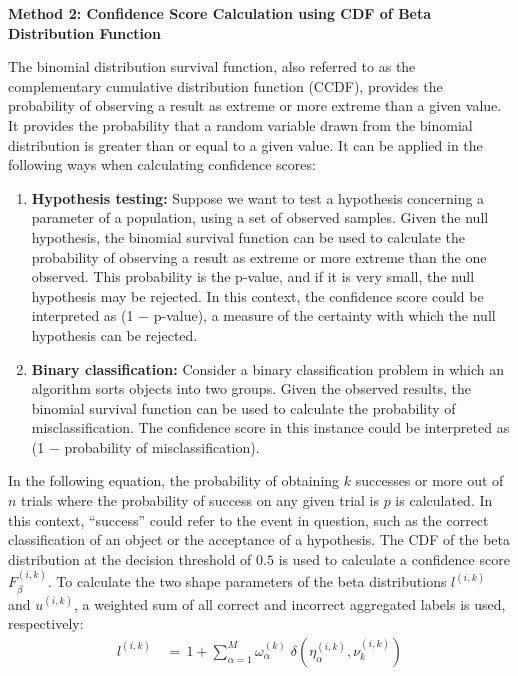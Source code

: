 \documentclass[default]{bst/sn-jnl_mine}%
\newenvironment{mymdframed}[1]{
	\begin{framed}
        \begin{center}
        \textbf{#1} \\
        \end{center}
        }
{\end{framed}}
\begin{document}
\begin{mymdframed}{Method 2: Confidence Score Calculation using CDF of Beta Distribution Function}
    The binomial distribution survival function, also referred to as the complementary cumulative distribution function (CCDF), provides the probability of observing a result as extreme or more extreme than a given value. It provides the probability that a random variable drawn from the binomial distribution is greater than or equal to a given value. It can be applied in the following ways when calculating confidence scores:
    \begin{enumerate}%
        \item \textbf{Hypothesis testing:}
        Suppose we want to test a hypothesis concerning a parameter of a population, using a set of observed samples. Given the null hypothesis, the binomial survival function can be used to calculate the probability of observing a result as extreme or more extreme than the one observed. This probability is the p-value, and if it is very small, the null hypothesis may be rejected. In this context, the confidence score could be interpreted as (1 $-$ p-value), a measure of the certainty with which the null hypothesis can be rejected.
        \item \textbf{Binary classification:} Consider a binary classification problem in which an algorithm sorts objects into two groups. Given the observed results, the binomial survival function can be used to calculate the probability of misclassification. The confidence score in this instance could be interpreted as (1 $-$ probability of misclassification).
    \end{enumerate}
    In the following equation, the probability of obtaining $k$ successes or more out of $n$ trials where the probability of success on any given trial is $p$ is calculated. In this context, ``success'' could refer to the event in question, such as the correct classification of an object or the acceptance of a hypothesis. The CDF of the beta distribution at the decision threshold of $0.5 $ is used to calculate a confidence score $F_{\beta}^{(i,k)}$. To calculate the two shape parameters of the beta distributions $l^{(i,k)}$ and $u^{(i,k)}$, a weighted sum of all correct and incorrect aggregated labels is used, respectively:
    \begin{equation}
        \begin{aligned}
            l^{(i,k)} \, & = \, 1 + \sum_{\alpha=1}^{M} \omega_{\alpha}^{(k)} \; \delta\left(\eta_{\alpha}^{(i,k)}, \nu_{k}^{(i,k)}\right) \\

\end{aligned}
\end{equation}
\end{mymdframed}
\end{document}
